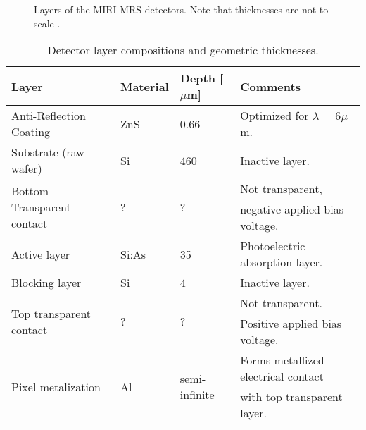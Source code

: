 \begin{figure}
	\centering
	\begin{scriptsize}
	\end{scriptsize}
	\caption{Layers of the MIRI MRS detectors. Note that thicknesses are not to scale \parencite{MIRI7}.}
	\label{fig:layers}
\end{figure}
\begin{table}[h]
	\centering
	\begin{footnotesize}
	\begin{tabular}{llll}
		\toprule
		\textbf{Layer} & \textbf{Material} & \textbf{Depth [$\mu$m]} & \textbf{Comments}\\
		\midrule 
		Anti-Reflection Coating & ZnS & 0.66 & Optimized for $\lambda$ = 6$\mu$m.\\
		Substrate (raw wafer) & Si & 460 & Inactive layer.\\
		\multirow{2}{*}{Bottom Transparent contact} & \multirow{2}{*}{?} & \multirow{2}{*}{?} & Not transparent,\\&&& negative applied bias voltage.\\
		Active layer & Si:As & 35 & Photoelectric absorption layer.\\
		Blocking layer & Si & 4 & Inactive layer.\\
		\multirow{2}{*}{Top transparent contact} & \multirow{2}{*}{?} & \multirow{2}{*}{?} & Not transparent.\\&&& Positive applied bias voltage.\\
		\multirow{2}{*}{Pixel metalization} & \multirow{2}{*}{Al} & \multirow{2}{*}{semi-infinite} & Forms metallized electrical contact\\ &&&with top transparent layer.\\
		\bottomrule
	\end{tabular}
	\end{footnotesize}
	\caption{Detector layer compositions and geometric thicknesses.}
	\label{tab:layers}
\end{table}

